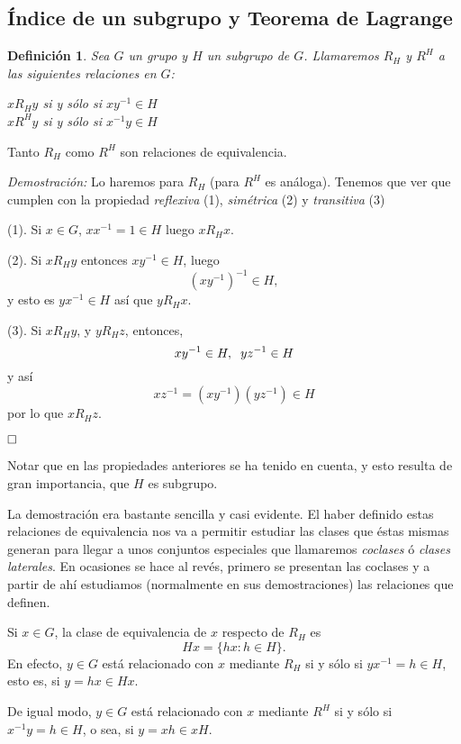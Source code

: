 \documentclass[12pt]{article}
\newtheorem{definition}[theorem]{Definición}
\begin{document}
\subsection{Índice de un subgrupo y Teorema de Lagrange}

\begin{definition}Sea $G$ un grupo y $H$ un subgrupo de $G$. Llamaremos $R_{H}$ y $R^{H}$ a las siguientes \textit{relaciones} en $G$:
\begin{center}
$xR_{H}y$ si y sólo si $xy^{-1} \in H$\\
$xR^{H}y$ si y sólo si $x^{-1}y \in H$
\end{center}
\end{definition}

Tanto $R_{H}$ como  $R^{H}$ son relaciones de equivalencia.

\emph{Demostración: } Lo haremos para $R_{H}$ (para $R^{H}$ es análoga). Tenemos que ver que cumplen con la propiedad \textit{reflexiva} (1), \textit{simétrica} (2) y \textit{transitiva} (3)

(1). Si $x \in G$, $xx^{-1} = 1 \in H$ luego $xR_{H}x$.

(2). Si $xR_{H}y$ entonces $xy^{-1} \in H$, luego $$(xy^{-1})^{-1} \in H,$$ y esto es $yx^{-1} \in H$ así que $yR_{H}x$.

(3). Si $xR_{H}y$, y $yR_{H}z$, entonces, $$xy^{-1} \in H, \hspace{0.2cm} yz^{-1} \in H$$
y así $$xz^{-1} = (xy^{-1})(yz^{-1}) \in H$$ por lo que $xR_{H}z$.

$\hfill \square$

Notar que en las propiedades anteriores se ha tenido en cuenta, y esto resulta de gran importancia, que $H$ es subgrupo.

La demostración era bastante sencilla y casi evidente. El haber definido estas relaciones de equivalencia nos va a permitir estudiar las clases que éstas mismas generan para llegar a unos conjuntos especiales que llamaremos \textit{coclases} ó \textit{clases laterales}. En ocasiones se hace al revés, primero se presentan las coclases y a partir de ahí estudiamos (normalmente en sus demostraciones) las relaciones que definen.

Si $x \in G$, la clase de equivalencia de $x$ respecto de $R_H$ es $$Hx = \lbrace hx : h \in H \rbrace.$$ En efecto, $y \in G$ está relacionado con $x$ mediante $R_H$ si y sólo si $yx^{-1} = h \in H$, esto es, si $y = hx \in Hx$.

De igual modo, $y \in G$ está relacionado con $x$ mediante $R^H$ si y sólo si $x^{-1}y = h \in H$, o sea, si $y = xh \in xH$.
\end{document}
